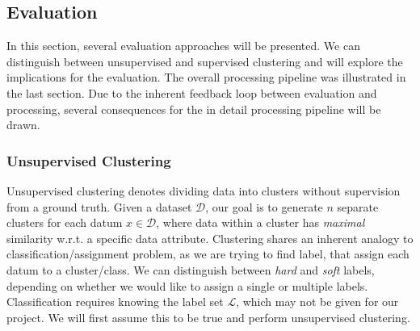 \newpage %
\subsection{Evaluation}
\label{subsec:eval}
In this section, several evaluation approaches will be presented. We can distinguish between unsupervised and supervised clustering and will explore the implications for the evaluation. The overall processing pipeline was illustrated in the last section. Due to the inherent feedback loop between evaluation and processing, several consequences for the in detail processing pipeline will be drawn.





\subsubsection{Unsupervised Clustering}
Unsupervised clustering denotes dividing data into clusters without supervision from a ground truth. Given a dataset $ \mathcal{D} $, our goal is to generate $ n $ separate clusters for each datum $ x \in \mathcal{D} $, where data within a cluster has \textit{maximal} similarity w.r.t. a specific data attribute. Clustering shares an inherent analogy to classification/assignment problem, as we are trying to find label, that assign each datum to a cluster/class. We can distinguish between \textit{hard} and \textit{soft} labels, depending on whether we would like to assign a single or multiple labels. Classification requires knowing the label set $ \mathcal{L} $, which may not be given for our project. We will first assume this to be true and perform unsupervised clustering. 

